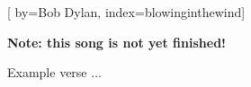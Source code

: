 

[%
    by={Bob Dylan},
    index={blowinginthewind}]


    \label{blowinginthewind}

    \textbf{Note: this song is not yet finished!}

    \beginverse
        Example verse ...
    \endverse
\endsong
